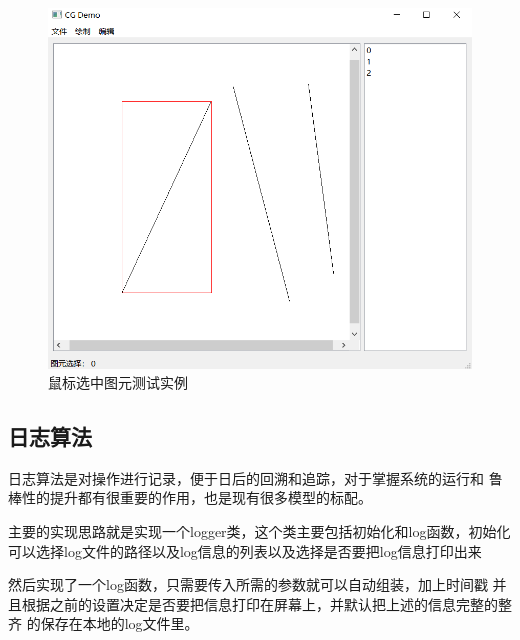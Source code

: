 \documentclass[a4paper,UTF8]{article}
\theoremstyle{definition}
\begin{document}
\begin{figure}[htbp]
{\begin{minipage}{7cm}
        \includegraphics[scale=0.2]{figure/choose2.png}   %
        \end{minipage}
    }
     
    \caption{鼠标选中图元测试实例} %
    \label{fig:1}  %
\end{figure}

\subsection{日志算法}
日志算法是对操作进行记录，便于日后的回溯和追踪，对于掌握系统的运行和
鲁棒性的提升都有很重要的作用，也是现有很多模型的标配。

主要的实现思路就是实现一个logger类，这个类主要包括初始化和log函数，初始化
可以选择log文件的路径以及log信息的列表以及选择是否要把log信息打印出来

然后实现了一个log函数，只需要传入所需的参数就可以自动组装，加上时间戳
并且根据之前的设置决定是否要把信息打印在屏幕上，并默认把上述的信息完整的整齐
的保存在本地的log文件里。
\end{document}
